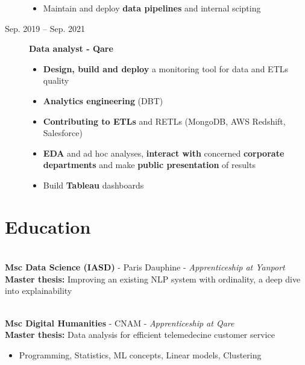 \documentclass[a4paper,10pt]{article}
\begin{document}
\begin{adjustbox}{valign=t}
\begin{minipage}{0.6\textwidth}
\begin{description}
\begin{itemize}[topsep=0pt]
                    \item Maintain and deploy \textbf{data pipelines} and internal scipting
                \end{itemize}
                \normalsize
            \item[\normalfont \textcolor{ColorOne}{Sep. 2019 -- Sep. 2021}]
                \textbf{Data analyst - Qare}\\
                \small
                \begin{itemize}[topsep=0pt]
                    \item \textbf{Design, build and deploy} a monitoring tool for data and ETLs quality
                    \item \textbf{Analytics engineering} (DBT)
                    \item \textbf{Contributing to ETLs} and RETLs (MongoDB, AWS Redshift, Salesforce)
                    \item \textbf{EDA} and ad hoc analyses, \textbf{interact with} concerned \textbf{corporate departments} and make \textbf{public presentation} of results
                    \item Build \textbf{Tableau} dashboards
                \end{itemize}
                \normalsize
        \end{description}
        \vspace{-1cm}
        \section*{Education}
        \vspace{-.3cm}
        \begin{description}
            \raggedright
            \item [\normalfont \textcolor{ColorOne}{2021 -- 2022}]~\\
                  \textbf{Msc Data Science (IASD)} - Paris Dauphine - \textit{Apprenticeship at Yanport}\\
                  \quad \textbf{Master thesis:} Improving an existing NLP system with ordinality, a deep dive into explainability
            \item [\normalfont \textcolor{ColorOne}{2019 -- 2021}]~\\
                  \textbf{Msc Digital Humanities} - CNAM - \textit{Apprenticeship at Qare}\\
                  \quad \textbf{Master thesis:} Data analysis for efficient telemedecine customer service\\
                  \small
                  \begin{itemize}[topsep=0pt]
                      \item Programming, Statistics, ML concepts, Linear models, Clustering\\[.2cm]
                  \end{itemize}
                  \normalsize


\end{description}
\end{minipage}
\end{adjustbox}
\end{document}
